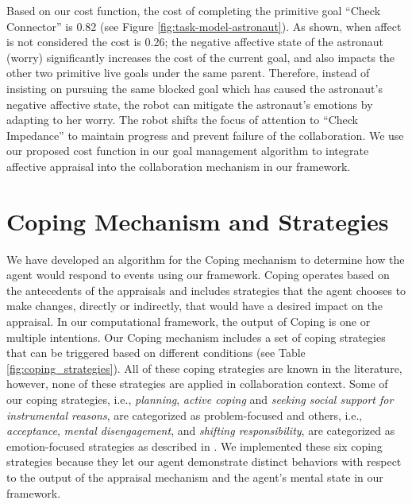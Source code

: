 \documentclass[12pt]{report}
\begin{document}
Based on our cost function, the cost of completing the primitive goal ``Check
Connector'' is 0.82 (see Figure \ref{fig:task-model-astronaut}). As shown, when
affect is not considered the cost is 0.26; the negative affective state of the astronaut
(worry) significantly increases the cost of the current goal, and also impacts
the other two primitive live goals under the same parent. Therefore, instead of
insisting on pursuing the same blocked goal which has caused the astronaut's
negative affective state, the robot can mitigate the astronaut's emotions by adapting to
her worry. The robot shifts the focus of attention to ``Check Impedance'' to
maintain progress and prevent failure of the collaboration. We use our proposed
cost function in our goal management algorithm to integrate affective appraisal
into the collaboration mechanism in our framework.

\section{Coping Mechanism and Strategies}
\label{sec:coping-mechanism}
We have developed an algorithm for the Coping mechanism to determine how the
agent would respond to events using our framework. Coping operates
based on the antecedents of the appraisals and includes strategies that the
agent chooses to make changes, directly or indirectly, that would have a desired
impact on the appraisal. In our computational framework, the output of Coping is
one or multiple intentions. Our Coping mechanism includes
a set of coping strategies that can be triggered based on different conditions
(see Table \ref{fig:coping_strategies}). All of these coping strategies are
known in the literature, however, none of these strategies are applied in
collaboration context. Some of our coping strategies, i.e., \textit{planning},
\textit{active coping} and \textit{seeking social support for instrumental
reasons}, are categorized as problem-focused and others, i.e.,
\textit{acceptance}, \textit{mental disengagement}, and \textit{shifting
responsibility}, are categorized as emotion-focused strategies as described in
\cite{gratch:domain-independent}. We implemented these six coping strategies
because they let our agent demonstrate distinct behaviors with respect to the
output of the appraisal mechanism and the agent's mental state in our framework.
\end{document}

